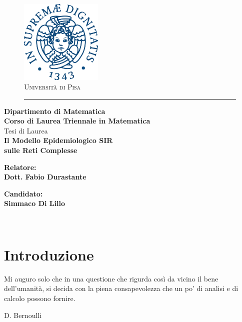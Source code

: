 \documentclass[12pt,a4paper,twoside]{report}
\begin{document}
\begin{titlepage}
\begin{figure}[t]
	\centering\includegraphics[width=0.35\textwidth]{figure/stemma_unipi.png}\\[1em]
	{\LARGE \textsc{Università di Pisa}}\\
	\vspace*{-0.5em}\rule{0.6\textwidth}{0.4pt}
\end{figure}
\begin{center}
	\textbf{ Dipartimento di Matematica\\ Corso di Laurea Triennale in Matematica \\}
	\vspace{15mm}
	{\centering Tesi di Laurea}\\[1em]
    {\LARGE{\bf Il Modello Epidemiologico SIR \\ sulle Reti Complesse}}\\
	\vspace{3mm}
\end{center}

\vspace{36mm}

\begin{minipage}[t]{0.47\textwidth}
	{\large{\bf Relatore:\\Dott. Fabio Durastante}}
\end{minipage}\hfill
\begin{minipage}[t]{0.47\textwidth}\raggedleft
	{\large{\bf Candidato:\\Simmaco Di Lillo}}
\end{minipage}

\vfill
\centering{\rule{0.5\textwidth}{0.4pt}}\\

\end{titlepage}

\chapter*{Introduzione}
\epigraph{Mi auguro solo che in una questione che rigurda cos\`i da vicino il bene dell'umanit\`a, si decida con la piena consapevolezza che un po' di analisi e di calcolo possono fornire.}{D. Bernoulli}
\end{document}
